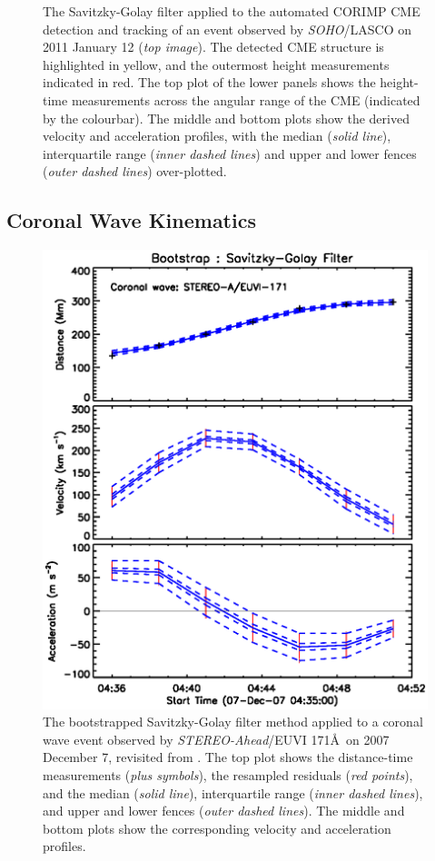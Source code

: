 \documentclass[structabstract]{aa}
\begin{document}
\begin{figure}[!t]
\caption{The Savitzky-Golay filter applied to the automated CORIMP CME detection and tracking of an event observed by \emph{SOHO}/LASCO on 2011 January 12 (\emph{top image}). The detected CME structure is highlighted in yellow, and the outermost height measurements indicated in red. The top plot of the lower panels shows the height-time measurements across the angular range of the CME (indicated by the colourbar). The middle and bottom plots show the derived velocity and acceleration profiles, with the median (\emph{solid line}), interquartile range (\emph{inner dashed lines}) and upper and lower fences (\emph{outer dashed lines}) over-plotted.}
\label{fig_savgol_CME_CORIMP}
\end{figure}


\subsection{Coronal Wave Kinematics}
\label{subsect:corpita}

\begin{figure}
\centering
\includegraphics[scale=0.6, trim=0 40 0 30]{images/fit_kinscasestudy_wave20071207.eps}
\caption{The bootstrapped Savitzky-Golay filter method applied to a coronal wave event observed by \emph{STEREO-Ahead}/EUVI 171\AA\ on 2007 December 7, revisited from \citet{2011A&A...531A..42L}. The top plot shows the distance-time measurements (\emph{plus symbols}), the resampled residuals (\emph{red points}), and the median (\emph{solid line}), interquartile range (\emph{inner dashed lines}), and upper and lower fences (\emph{outer dashed lines}). The middle and bottom plots show the corresponding velocity and acceleration profiles.}
\label{fig_savgol_wave}
\end{figure}
\end{document}
